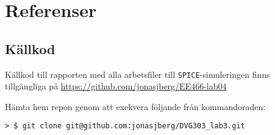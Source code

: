 %
%

\section{Referenser}\label{refs}


\subsection{Källkod}\label{sourcefiles}
Källkod till rapporten med alla arbetsfiler till \texttt{SPICE}-simuleringen
finns tillgängliga på \url{https://github.com/jonasjberg/EE466-lab04}
\par Hämta hem repon genom att exekvera följande från kommandoraden:
\begin{verbatim}
> $ git clone git@github.com:jonasjberg/DVG303_lab3.git
\end{verbatim}

